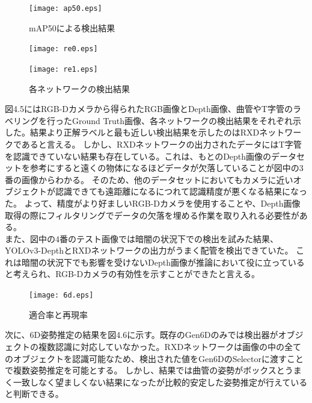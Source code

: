 \begin{figure}[htbt]
	\centering
	
	 \texttt{[image: ap50.eps]}
	 \caption{mAP50による検出結果}
	 \label{fig:f2}
\end{figure}

\newpage

\begin{figure}[htbt]
	\centering
	 \texttt{[image: re0.eps]}
	 \label{fig:f2}
\end{figure}

\begin{figure}[htbt]
	\centering
	 \texttt{[image: re1.eps]}
	 \caption{各ネットワークの検出結果}
	 \label{fig:f2}
\end{figure}

\newpage

\clearpage

図4.5にはRGB-Dカメラから得られたRGB画像とDepth画像、曲管やT字管のラベリングを行ったGround Truth画像、各ネットワークの検出結果をそれぞれ示した。結果より正解ラベルと最も近しい検出結果を示したのはRXDネットワークであると言える。
しかし、RXDネットワークの出力されたデータにはT字管を認識できていない結果も存在している。これは、もとのDepth画像のデータセットを参考にすると遠くの物体になるほどデータが欠落していることが図中の3番の画像からわかる。
そのため、他のデータセットにおいてもカメラに近いオブジェクトが認識できても遠距離になるにつれて認識精度が悪くなる結果になった。
よって、精度がより好ましいRGB-Dカメラを使用することや、Depth画像取得の際にフィルタリングでデータの欠落を埋める作業を取り入れる必要性がある。\\
 また、図中の4番のテスト画像では暗闇の状況下での検出を試みた結果、YOLOv3-DepthとRXDネットワークの出力がうまく配管を検出できていた。
これは暗闇の状況下でも影響を受けないDepth画像が推論において役に立っていると考えられ、RGB-Dカメラの有効性を示すことができたと言える。

\begin{figure}[htbt]
	\centering
	 \texttt{[image: 6d.eps]}
	 \caption{適合率と再現率}
	 \label{fig:f2}
\end{figure}

次に、6D姿勢推定の結果を図4.6に示す。既存のGen6Dのみでは検出器がオブジェクトの複数認識に対応していなかった。RXDネットワークは画像の中の全てのオブジェクトを認識可能なため、検出された値をGen6DのSelectorに渡すことで複数姿勢推定を可能とする。
しかし、結果では曲管の姿勢がボックスとうまく一致しなく望ましくない結果になったが比較的安定した姿勢推定が行えていると判断できる。

